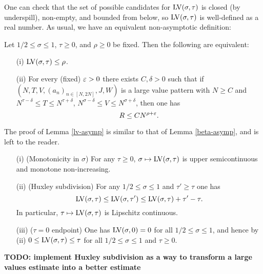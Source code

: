 
One can check that the set of possible candidates for $\mathrm{LV}(\sigma,\tau)$ is closed (by underspill), non-empty, and bounded from below, so $\mathrm{LV}(\sigma,\tau)$ is well-defined as a real number.  As usual, we have an equivalent non-asymptotic definition:

\begin{lemma}\label{lv-asymp} Let $1/2 \leq \sigma \leq 1$, $\tau \geq 0$, and $\rho \geq 0$ be fixed.  Then the following are equivalent:
    \begin{itemize}
    \item[(i)] $\mathrm{LV}(\sigma,\tau) \leq \rho$.
    \item[(ii)] For every (fixed)  $\varepsilon>0$ there exists $C, \delta>0$ such that if $(N,T,V,(a_n)_{n \in [N,2N]},J,W)$ is a large value pattern with $N \geq C$ and $N^{\tau-\delta} \leq T \leq N^{\tau+\delta}$, $N^{\sigma-\delta} \leq V \leq N^{\sigma+\delta}$, then one has
    $$ R \leq C N^{\rho+\varepsilon}.$$
    \end{itemize}
\end{lemma}

The proof of Lemma \ref{lv-asymp} is similar to that of Lemma \ref{beta-asymp}, and is left to the reader.


\begin{lemma}\label{lv-basic}
    \begin{itemize}
        \item[(i)] (Monotonicity in $\sigma$) For any $\tau \geq 0$, $\sigma \mapsto \mathrm{LV}(\sigma,\tau)$ is upper semicontinuous and monotone non-increasing.
        \item[(ii)] (Huxley subdivision) For any $1/2 \leq \sigma \leq 1$ and $\tau' \geq \tau$ one has
$$ \mathrm{LV}(\sigma,\tau) \leq \mathrm{LV}(\sigma,\tau') \leq \mathrm{LV}(\sigma,\tau) + \tau'-\tau.$$
In particular, $\tau \mapsto \mathrm{LV}(\sigma,\tau)$ is Lipschitz continuous.
        \item[(iii)]  ($\tau=0$ endpoint) One has $\mathrm{LV}(\sigma,0)=0$ for all $1/2 \leq \sigma \leq 1$, and hence by (ii) $0 \leq \mathrm{LV}(\sigma,\tau) \leq \tau$ for all $1/2 \leq \sigma \leq 1$ and $\tau \geq 0$.
    \end{itemize}
\end{lemma}

{\bf TODO: implement Huxley subdivision as a way to transform a large values estimate into a better estimate}

